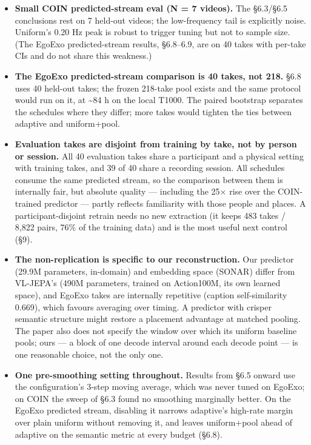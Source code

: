 \begin{itemize}
\item \textbf{Small COIN predicted-stream eval (N = 7 videos).} The \S6.3/\S6.5 conclusions rest on 7 held-out videos; the low-frequency tail is explicitly noise. Uniform's 0.20 Hz peak is robust to trigger tuning but not to sample size. (The EgoExo predicted-stream results, \S6.8--6.9, are on 40 takes with per-take CIs and do not share this weakness.)
\item \textbf{The EgoExo predicted-stream comparison is 40 takes, not 218.} \S6.8 uses 40 held-out takes; the frozen 218-take pool exists and the same protocol would run on it, at \textasciitilde{}84 h on the local T1000. The paired bootstrap separates the schedules where they differ; more takes would tighten the ties between adaptive and uniform+pool.
\item \textbf{Evaluation takes are disjoint from training by take, not by person or session.} All 40 evaluation takes share a participant and a physical setting with training takes, and 39 of 40 share a recording session. All schedules consume the same predicted stream, so the comparison between them is internally fair, but absolute quality --- including the 25$\times$ rise over the COIN-trained predictor --- partly reflects familiarity with those people and places. A participant-disjoint retrain needs no new extraction (it keeps 483 takes / 8,822 pairs, 76\% of the training data) and is the most useful next control (\S9).
\item \textbf{The non-replication is specific to our reconstruction.} Our predictor (29.9M parameters, in-domain) and embedding space (SONAR) differ from VL-JEPA's (490M parameters, trained on Action100M, its own learned space), and EgoExo takes are internally repetitive (caption self-similarity 0.669), which favours averaging over timing. A predictor with crisper semantic structure might restore a placement advantage at matched pooling. The paper also does not specify the window over which its uniform baseline pools; ours --- a block of one decode interval around each decode point --- is one reasonable choice, not the only one.
\item \textbf{One pre-smoothing setting throughout.} Results from \S6.5 onward use the configuration's 3-step moving average, which was never tuned on EgoExo; on COIN the sweep of \S6.3 found no smoothing marginally better. On the EgoExo predicted stream, disabling it narrows adaptive's high-rate margin over plain uniform without removing it, and leaves uniform+pool ahead of adaptive on the semantic metric at every budget (\S6.8).

\end{itemize}
